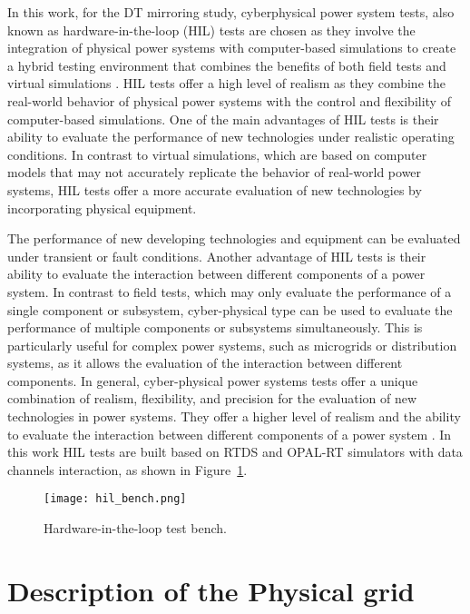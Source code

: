 In this work, for the DT mirroring study, cyberphysical power system tests, also known as hardware-in-the-loop (HIL) tests are chosen as they involve the integration of physical power systems with computer-based simulations to create a hybrid testing environment that combines the benefits of both field tests and virtual simulations \autocite{7289345}. HIL tests offer a high level of realism as they combine the real-world behavior of physical power systems with the control and flexibility of computer-based simulations. One of the main advantages of HIL tests is their ability to evaluate the performance of new technologies under realistic operating conditions. In contrast to virtual simulations, which are based on computer models that may not accurately replicate the behavior of real-world power systems, HIL tests offer a more accurate evaluation of new technologies by incorporating physical equipment. 

The performance of new developing technologies and equipment can be evaluated under transient or fault conditions. Another advantage of HIL tests is their ability to evaluate the interaction between different components of a power system. In contrast to field tests, which may only evaluate the performance of a single component or subsystem, cyber-physical type can be used to evaluate the performance of multiple components or subsystems simultaneously. This is particularly useful for complex power systems, such as microgrids or distribution systems, as it allows the evaluation of the interaction between different components. In general, cyber-physical power systems tests offer a unique combination of realism, flexibility, and precision for the evaluation of new technologies in power systems. They offer a higher level of realism and the ability to evaluate the interaction between different components of a power system \autocite{7740849}. In this work HIL tests are built based on RTDS and OPAL-RT simulators with data channels interaction, as shown in Figure~\cref{fig:hil_bench}.

\begin{figure}[ht]
    \centering
    \texttt{[image: hil\_bench.png]}
    \caption{Hardware-in-the-loop test bench.}
    \label{fig:hil_bench}
\end{figure}


\section{Description of the Physical grid}\label{sec:ch4/sec1}

